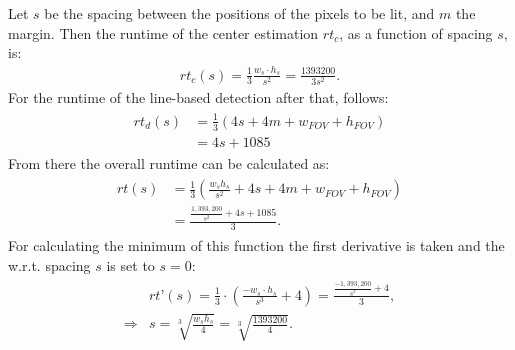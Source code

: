 \documentclass[journal,final,a4paper,twoside]{PS}
\begin{document}
Let $s$ be the spacing between the positions of the pixels to be lit, and $m$ the margin. Then the runtime of the center estimation $rt_c$, as a function of spacing $s$, is:
\begin{align}
rt_c (s) =\frac{1}{3} \frac{w_s\cdot h_s}{ s^2} =\frac{1393200}{3s^2} .
\end{align}
For the runtime of the line-based detection after that, follows:
\begin{align}\begin{split}
rt_d (s) &=\frac{1}{3}\left( 4s + 4 m + w_{FOV} + h_{FOV}\right)\\& = 4s + 1085\end{split}
\end{align}
From there the overall runtime can be calculated as:
\begin{align}\begin{split}
rt(s) &=\frac{1}{3}\left(\frac{w_s h_s}{s^2} + 4s + 4m + w_{FOV} + h_{FOV}\right)\\& = \frac{\frac{1,393,200}{s^2} + 4s +1085}{3}.\end{split}
\end{align}
For calculating the minimum of this function the first derivative is taken and the w.r.t. spacing $s$ is set to $s=0$:
\begin{align}\begin{split}
&rt’(s) = \frac{1}{3} \cdot \left( \frac{-w_s \cdot h_s}{s^3 }  + 4\right) = \frac{ \frac{-1,393,200}{s^3}+ 4}{3},\\
\Rightarrow &s = \sqrt[3]{\frac{w_s  h_s}{4}} = \sqrt[3]{\frac{1393200}{4}}. \end{split}
\end{align}
\end{document}
